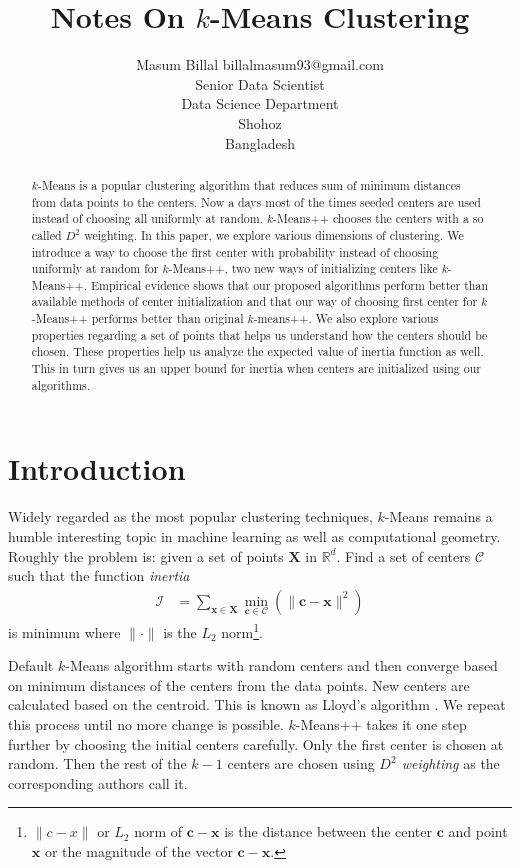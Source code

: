 \documentclass[twoside, 11pt]{article}
\title{Notes On $k$-Means Clustering}
\author{\name Masum Billal \email billalmasum93@gmail.com \\
	Senior Data Scientist\\
	\addr Data Science Department\\
	Shohoz\\
	Bangladesh}
\newcommand{\x}{\mathbf{x}}
\newcommand{\X}{\mathbf{X}}
\renewcommand{\c}{\mathbf{c}}
\newcommand{\C}{\mathcal{C}}
\begin{document}
	
	\maketitle
		\begin{abstract}%
			$k$-Means is a popular clustering algorithm that reduces sum of minimum distances from data points to the centers. Now a days most of the times seeded centers are used instead of choosing all uniformly at random. $k$-Means++ chooses the centers with a so called $D^2$ weighting. In this paper, we explore various dimensions of clustering. We introduce a way to choose the first center with probability instead of choosing uniformly at random for $k$-Means++, two new ways of initializing centers like $k$-Means++. Empirical evidence shows that our proposed algorithms perform better than available methods of center initialization and that our way of choosing first center for $k$-Means++ performs better than original $k$-means++. We also explore various properties regarding a set of points that helps us understand how the centers should be chosen. These properties help us analyze the expected value of inertia function as well. This in turn gives us an upper bound for inertia when centers are initialized using our algorithms.
		\end{abstract}
	\section{Introduction}
	Widely regarded as the most popular clustering techniques, $k$-Means remains a humble interesting topic in machine learning as well as computational geometry. Roughly the problem is: given a set of points $\X$ in $\mathbb{R}^d$. Find a set of centers $\mathcal{C}$ such that the function \textit{inertia}
		\begin{align*}
			\mathcal{I} & = \sum_{\x\in\X}\min_{\c\in\C}(\|\c-\x\|^2)
		\end{align*}
	is minimum where $\|\cdot\|$ is the $L_2$ norm\footnote{$\|c-x\|$ or $L_2$ norm of $\c-\x$ is the distance between the center $\c$ and point $\x$ or the magnitude of the vector $\c-\x$.}.
	
	Default $k$-Means algorithm starts with random centers and then converge based on minimum distances of the centers from the data points. New centers are calculated based on the centroid. This is known as Lloyd's algorithm \citep{lloyd}. We repeat this process until no more change is possible. $k$-Means++ \citep{kmeans++} takes it one step further by choosing the initial centers carefully. Only the first center is chosen at random. Then the rest of the $k-1$ centers are chosen using \textit{$D^2$ weighting} as the corresponding authors call it. 
	
\end{document}
